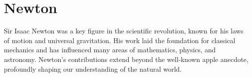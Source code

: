 \section{Newton}
\label{app:Newton}

Sir Isaac Newton was a key figure in the scientific revolution, known for his laws of motion and universal gravitation. His work laid the foundation for classical mechanics and has influenced many areas of mathematics, physics, and astronomy. Newton's contributions extend beyond the well-known apple anecdote, profoundly shaping our understanding of the natural world.
